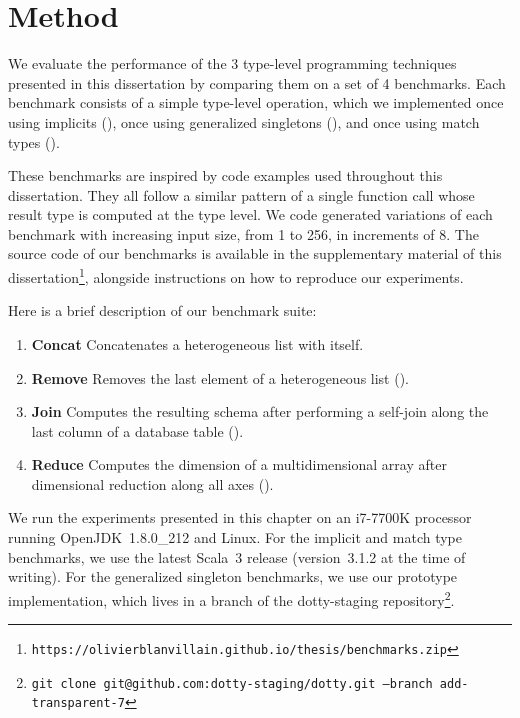 \section{Method}

We evaluate the performance of the 3 type-level programming techniques presented in this dissertation by comparing them on a set of 4 benchmarks.
Each benchmark consists of a simple type-level operation, which we implemented once using implicits (), once using generalized singletons (), and once using match types ().

These benchmarks are inspired by code examples used throughout this dissertation. They all follow a similar pattern of a single function call whose result type is computed at the type level. We code generated variations of each benchmark with increasing input size, from 1 to 256, in increments of 8.
The source code of our benchmarks is available in the supplementary material of this dissertation\footnote{\texttt{https://olivierblanvillain.github.io/thesis/benchmarks.zip}}, alongside instructions on how to reproduce our experiments.

Here is a brief description of our benchmark suite:

\begin{enumerate}
  \item \textbf{Concat}\quad
  Concatenates a heterogeneous list with itself.

  \item \textbf{Remove}\quad
  Removes the last element of a heterogeneous list ().

  \item \textbf{Join}\quad
  Computes the resulting schema after performing a self-join along the last column of a database table ().

  \item \textbf{Reduce}\quad
  Computes the dimension of a multidimensional array after dimensional reduction along all axes ().
\end{enumerate}

We run the experiments presented in this chapter on an i7-7700K processor running OpenJDK~1.8.0\_212 and Linux.
For the implicit and match type benchmarks, we use the latest Scala~3 release (version~3.1.2 at the time of writing).
For the generalized singleton benchmarks, we use our prototype implementation, which lives in a branch of the dotty-staging repository\footnote{\texttt{git clone git@github.com:dotty-staging/dotty.git --branch add-transparent-7}}.

